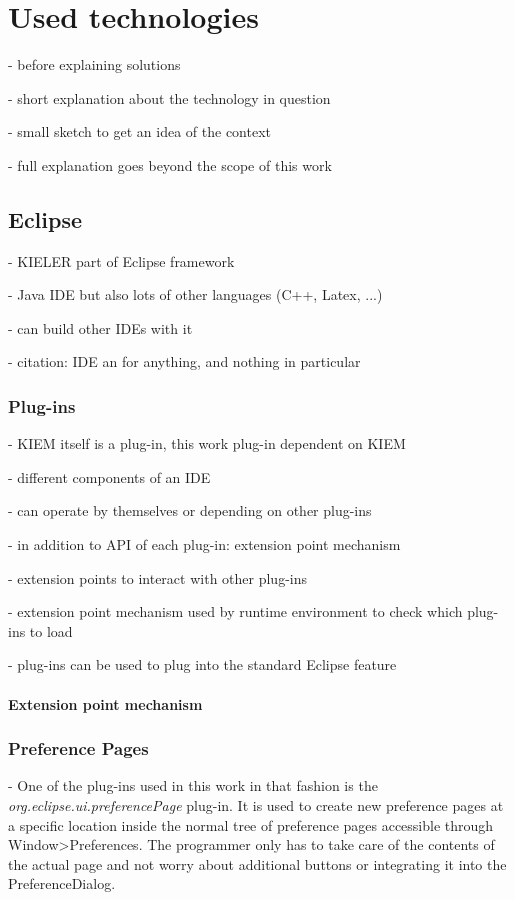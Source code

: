 \chapter{Used technologies}
\label{chapter:ConfTechnology}
- before explaining solutions

- short explanation about the technology in question

- small sketch to get an idea of the context

- full explanation goes beyond the scope of this work

\section{Eclipse}
- KIELER part of Eclipse framework

- Java IDE but also lots of other languages (C++, Latex, ...)

- can build other IDEs with it

- citation: IDE an for anything, and nothing in particular \cite{eclipseOverview}

\subsection{Plug-ins}
- \ac{KIEM} itself is a plug-in, this work plug-in dependent on \ac{KIEM}

- different components of an \ac{IDE} 

- can operate by themselves or depending on other plug-ins

- in addition to \ac{API} of each plug-in: extension point mechanism

- extension points to interact with other plug-ins

- extension point mechanism used by runtime environment to check which plug-ins to load

- plug-ins can be used to plug into the standard Eclipse feature
\subsubsection{Extension point mechanism}
\label{section:TechExtension}


\subsection{Preference Pages}
\label{section:TechPreferencePage}
- One of the plug-ins used in this work in that fashion is the \emph{org.eclipse.ui.preferencePage}
plug-in. It is used to create new preference pages at a specific location inside the
normal tree of preference pages accessible through Window>Preferences.
The programmer only has to take care of the contents of the actual page and not worry
about additional buttons or integrating it into the PreferenceDialog.


